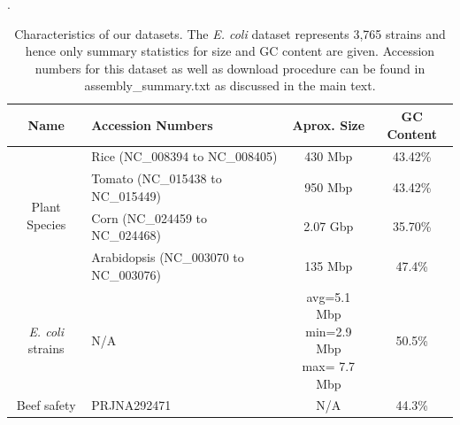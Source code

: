 \begin{table}[h]
\caption{Characteristics of our datasets.  The \emph{E. coli} dataset represents 3,765 strains and hence only summary statistics for size and GC content are given. Accession numbers for this dataset as well as download procedure can be found in assembly\_summary.txt as discussed in the main text.}.

  \centering
\begin{tabular}{|c|l|c|c|}
\hline
{\bf Name} &  {\bf Accession Numbers} & {\bf Aprox. Size} & {\bf GC Content} \\

\hline

\multirow{4}{*}{Plant Species }
& Rice  (NC\_008394 to NC\_008405) & 430 Mbp & 43.42\% \\
& Tomato  (NC\_015438 to NC\_015449) &  950 Mbp & 43.42\% \\
& Corn  (NC\_024459 to NC\_024468) & 2.07 Gbp & 35.70\% \\
& Arabidopsis  (NC\_003070 to NC\_003076) & 135 Mbp & 47.4\% \\
\hline

\emph{E. coli} strains &  N/A & \pbox{3cm}{avg=5.1 Mbp\\ min=2.9 Mbp\\ max= 7.7 Mbp} & 50.5\% \\

\hline

Beef safety &  PRJNA292471 & N/A & 44.3\% \\
\hline
\end{tabular}
\label{tbl-datasets}
\end{table}



